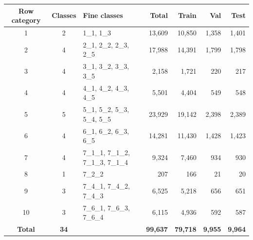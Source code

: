 \begin{tabular}{cclrrrr}
\toprule
\textbf{Row category} & \textbf{Classes} & \textbf{Fine classes} & \textbf{Total} & \textbf{Train} & \textbf{Val} & \textbf{Test} \\
\midrule
1 & 2 & 1\_1, 1\_3 & 13,609 & 10,850 & 1,358 & 1,401 \\
2 & 4 & 2\_1, 2\_2, 2\_3, 2\_5 & 17,988 & 14,391 & 1,799 & 1,798 \\
3 & 4 & 3\_1, 3\_2, 3\_3, 3\_5 & 2,158 & 1,721 & 220 & 217 \\
4 & 4 & 4\_1, 4\_2, 4\_3, 4\_5 & 5,501 & 4,404 & 549 & 548 \\
5 & 5 & 5\_1, 5\_2, 5\_3, 5\_4, 5\_5 & 23,929 & 19,142 & 2,398 & 2,389 \\
6 & 4 & 6\_1, 6\_2, 6\_3, 6\_5 & 14,281 & 11,430 & 1,428 & 1,423 \\
7 & 4 & 7\_1\_1, 7\_1\_2, 7\_1\_3, 7\_1\_4 & 9,324 & 7,460 & 934 & 930 \\
8 & 1 & 7\_2\_2 & 207 & 166 & 21 & 20 \\
9 & 3 & 7\_4\_1, 7\_4\_2, 7\_4\_3 & 6,525 & 5,218 & 656 & 651 \\
10 & 3 & 7\_6\_1, 7\_6\_3, 7\_6\_4 & 6,115 & 4,936 & 592 & 587 \\
\midrule
\textbf{Total} & \textbf{34} &  & \textbf{99,637} & \textbf{79,718} & \textbf{9,955} & \textbf{9,964} \\
\bottomrule
\end{tabular}

